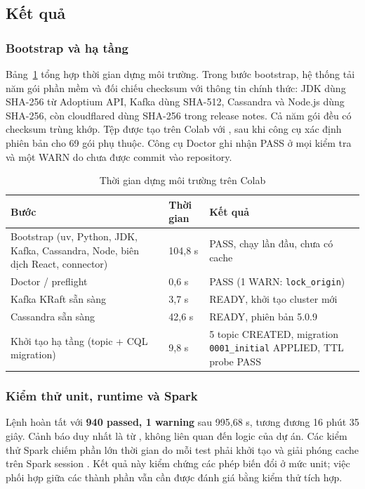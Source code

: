 \subsection{Kết quả}

\subsubsection{Bootstrap và hạ tầng}

Bảng~\ref{tab:bootstrap} tổng hợp thời gian dựng môi trường. Trong bước bootstrap, hệ thống tải năm gói phần mềm và đối chiếu checksum với thông tin chính thức: JDK dùng SHA-256 từ Adoptium API, Kafka dùng SHA-512, Cassandra và Node.js dùng SHA-256, còn cloudflared dùng SHA-256 trong release notes. Cả năm gói đều có checksum trùng khớp. Tệp  được tạo trên Colab với , sau khi công cụ xác định phiên bản cho 69 gói phụ thuộc. Công cụ Doctor ghi nhận PASS ở mọi kiểm tra và một WARN do  chưa được commit vào repository.

\begin{table}[H]
\centering
\tablefont
\caption{Thời gian dựng môi trường trên Colab}
\label{tab:bootstrap}
\begin{tabular}{p{5.43cm}p{2.13cm}p{7.57cm}}
\toprule
\textbf{Bước} & \textbf{Thời gian} & \textbf{Kết quả} \\
\midrule
Bootstrap (uv, Python, JDK, Kafka, Cassandra, Node, biên dịch React, connector) & 104,8 s & PASS, chạy lần đầu, chưa có cache \\
Doctor / preflight & 0,6 s & PASS (1 WARN: \texttt{lock\_origin}) \\
Kafka KRaft sẵn sàng & 3,7 s & READY, khởi tạo cluster mới \\
Cassandra sẵn sàng & 42,6 s & READY, phiên bản 5.0.9 \\
Khởi tạo hạ tầng (topic + CQL migration) & 9,8 s & 5 topic CREATED, migration \texttt{0001\_initial} APPLIED, TTL probe PASS \\
\bottomrule
\end{tabular}
\end{table}

\subsubsection{Kiểm thử unit, runtime và Spark}

Lệnh  hoàn tất với \textbf{940 passed, 1 warning} sau 995,68 s, tương đương 16 phút 35 giây. Cảnh báo duy nhất là  từ , không liên quan đến logic của dự án. Các kiểm thử Spark chiếm phần lớn thời gian do mỗi test phải khởi tạo và giải phóng cache trên Spark session . Kết quả này kiểm chứng các phép biến đổi ở mức unit; việc phối hợp giữa các thành phần vẫn cần được đánh giá bằng kiểm thử tích hợp.

